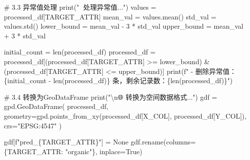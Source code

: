 \documentclass[
  letterpaper,
  DIV=11,
  numbers=noendperiod]{scrreprt}
\newenvironment{Shaded}{\begin{snugshade}}{\end{snugshade}}
\newcommand{\BuiltInTok}[1]{\textcolor[rgb]{0.00,0.23,0.31}{#1}}
\newcommand{\CharTok}[1]{\textcolor[rgb]{0.13,0.47,0.30}{#1}}
\newcommand{\CommentTok}[1]{\textcolor[rgb]{0.37,0.37,0.37}{#1}}
\newcommand{\DecValTok}[1]{\textcolor[rgb]{0.68,0.00,0.00}{#1}}
\newcommand{\NormalTok}[1]{\textcolor[rgb]{0.00,0.23,0.31}{#1}}
\newcommand{\OperatorTok}[1]{\textcolor[rgb]{0.37,0.37,0.37}{#1}}
\newcommand{\SpecialCharTok}[1]{\textcolor[rgb]{0.37,0.37,0.37}{#1}}
\newcommand{\SpecialStringTok}[1]{\textcolor[rgb]{0.13,0.47,0.30}{#1}}
\newcommand{\StringTok}[1]{\textcolor[rgb]{0.13,0.47,0.30}{#1}}
\newcommand{\VariableTok}[1]{\textcolor[rgb]{0.07,0.07,0.07}{#1}}
\begin{document}
\begin{Shaded}
\begin{Highlighting}[]
\CommentTok{\# 3.3 异常值处理}
\BuiltInTok{print}\NormalTok{(}\StringTok{"🚫 处理异常值..."}\NormalTok{)}
\NormalTok{values }\OperatorTok{=}\NormalTok{ processed\_df[TARGET\_ATTR]}
\NormalTok{mean\_val }\OperatorTok{=}\NormalTok{ values.mean()}
\NormalTok{std\_val }\OperatorTok{=}\NormalTok{ values.std()}
\NormalTok{lower\_bound }\OperatorTok{=}\NormalTok{ mean\_val }\OperatorTok{{-}} \DecValTok{3} \OperatorTok{*}\NormalTok{ std\_val}
\NormalTok{upper\_bound }\OperatorTok{=}\NormalTok{ mean\_val }\OperatorTok{+} \DecValTok{3} \OperatorTok{*}\NormalTok{ std\_val}

\NormalTok{initial\_count }\OperatorTok{=} \BuiltInTok{len}\NormalTok{(processed\_df)}
\NormalTok{processed\_df }\OperatorTok{=}\NormalTok{ processed\_df[(processed\_df[TARGET\_ATTR] }\OperatorTok{\textgreater{}=}\NormalTok{ lower\_bound) }\OperatorTok{\&} 
\NormalTok{                             (processed\_df[TARGET\_ATTR] }\OperatorTok{\textless{}=}\NormalTok{ upper\_bound)]}
\BuiltInTok{print}\NormalTok{(}\SpecialStringTok{f"   {-} 删除异常值：}\SpecialCharTok{\{}\NormalTok{initial\_count }\OperatorTok{{-}} \BuiltInTok{len}\NormalTok{(processed\_df)}\SpecialCharTok{\}}\SpecialStringTok{ 条，剩余记录数：}\SpecialCharTok{\{}\BuiltInTok{len}\NormalTok{(processed\_df)}\SpecialCharTok{\}}\SpecialStringTok{"}\NormalTok{)}

\CommentTok{\# 3.4 转换为GeoDataFrame}
\BuiltInTok{print}\NormalTok{(}\StringTok{"}\CharTok{\textbackslash{}n}\StringTok{🌐 转换为空间数据格式..."}\NormalTok{)}
\NormalTok{gdf }\OperatorTok{=}\NormalTok{ gpd.GeoDataFrame(}
\NormalTok{    processed\_df,}
\NormalTok{    geometry}\OperatorTok{=}\NormalTok{gpd.points\_from\_xy(processed\_df[X\_COL], processed\_df[Y\_COL]),}
\NormalTok{    crs}\OperatorTok{=}\StringTok{"EPSG:4547"}  
\NormalTok{)}

\NormalTok{gdf[}\SpecialStringTok{f"pred\_}\SpecialCharTok{\{}\NormalTok{TARGET\_ATTR}\SpecialCharTok{\}}\SpecialStringTok{"}\NormalTok{] }\OperatorTok{=} \VariableTok{None}
\NormalTok{gdf.rename(columns}\OperatorTok{=}\NormalTok{\{TARGET\_ATTR: }\StringTok{"organic"}\NormalTok{\}, inplace}\OperatorTok{=}\VariableTok{True}\NormalTok{) }


\end{Highlighting}
\end{Shaded}
\end{document}
